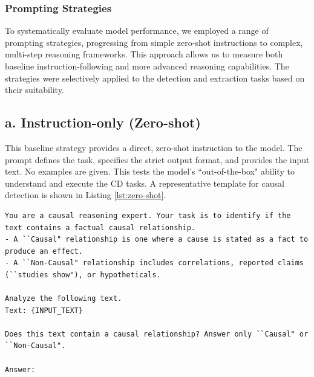 \documentclass[conference]{IEEEtran}
\begin{document}




\subsubsection{Prompting Strategies}
To systematically evaluate model performance, we employed a range of prompting strategies, progressing from simple zero-shot instructions to complex, multi-step reasoning frameworks. This approach allows us to measure both baseline instruction-following and more advanced reasoning capabilities. The strategies were selectively applied to the detection and extraction tasks based on their suitability.

\subsection*{a. Instruction-only (Zero-shot)}
This baseline strategy provides a direct, zero-shot instruction to the model. The prompt defines the task, specifies the strict output format, and provides the input text. No examples are given. This tests the model's ``out-of-the-box" ability to understand and execute the CD tasks. A representative template for causal detection is shown in Listing \ref{lst:zero-shot}.

\begin{listing}[tb]
\scriptsize
\begin{lstlisting}[language={}, captionpos=b, caption={Zero-shot instruction prompt for Causal Detection.}, label={lst:zero-shot}]
You are a causal reasoning expert. Your task is to identify if the text contains a factual causal relationship.
- A ``Causal" relationship is one where a cause is stated as a fact to produce an effect.
- A ``Non-Causal" relationship includes correlations, reported claims (``studies show"), or hypotheticals.

Analyze the following text.
Text: {INPUT_TEXT}

Does this text contain a causal relationship? Answer only ``Causal" or ``Non-Causal".

Answer:
\end{lstlisting}
\end{listing}
\end{document}
